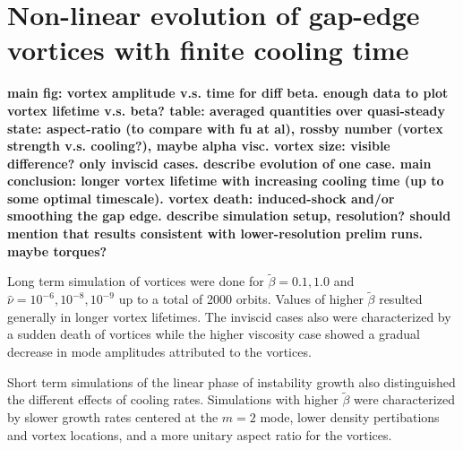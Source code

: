 

\section{Non-linear evolution of
  gap-edge vortices with finite cooling time} 
{\bf main fig: vortex amplitude v.s. time for diff beta. enough data
  to plot vortex lifetime v.s. beta? table: 
  averaged quantities over quasi-steady state: aspect-ratio (to
  compare with fu at al), rossby number (vortex strength
  v.s. cooling?), maybe alpha visc. vortex size: visible difference?  
  only inviscid cases. describe evolution of one case. main
  conclusion: longer vortex lifetime with increasing cooling time (up
  to some optimal timescale). vortex death: induced-shock and/or
  smoothing the gap edge. describe simulation setup, resolution?
  should mention that results consistent with lower-resolution prelim
  runs. maybe torques? 
}

Long term simulation of vortices were done for $\tilde{\beta}=0.1,1.0$ and
 $\hat{\nu}=10^{-6},10^{-8},10^{-9}$ up to a total of 2000 orbits. Values
 of higher $\tilde{\beta}$ resulted generally in longer vortex lifetimes.
 The inviscid cases also were characterized by a sudden death of vortices
 while the higher viscosity case showed a gradual decrease in mode amplitudes
 attributed to the vortices.

Short term simulations of the linear phase of instability growth also distinguished
 the different effects of cooling rates. Simulations with higher
 $\tilde{\beta}$ were characterized by slower growth rates centered at the
 $m=2$ mode, lower density pertibations and vortex locations, and a more unitary aspect
 ratio for the vortices.

